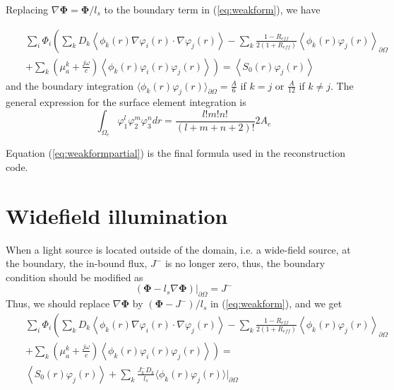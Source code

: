 \documentclass[12pt]{book}               %
\begin{document}
Replacing $\nabla{\boldsymbol\Phi}=\boldsymbol\Phi/l_s$ to the boundary term in (\ref{eq:weakform}), we
have

\begin{eqnarray}
\label{eq:weakformpartial}\nonumber&&\sum_{i}\Phi_i\left(\sum_{k}D_k\left\langle
\phi_k(r)\nabla\varphi_i(r)\cdot\nabla\varphi_j(r)\right\rangle -
\sum_{k}\frac{1-R_{eff}}{2(1+R_{eff})}\left\langle
\phi_k(r)\varphi_j(r)\right\rangle_{\partial\Omega}\right.
\\&&\left.+\sum_{k}\left(\mu_{a}^k+\frac{j\omega}{c}\right)\left\langle\phi_k(r)\varphi_i(r)\varphi_j(r)\right\rangle\right)=\left\langle
S_0(r)\varphi_j(r)\right\rangle
\end{eqnarray}
and the boundary integration $\langle\phi_k(r)\varphi_j(r)\rangle_{\partial\Omega}=\frac{A}{6}$ if $k=j$ 
or $\frac{A}{12}$ if $k\ne j$. The general expression for the surface element integration is
\begin{equation}
\int_{\Omega_e}\varphi_1^l\varphi_2^m\varphi_3^ndr=\frac{l!m!n!}{(l+m+n+2)!}2A_e
\end{equation}


Equation (\ref{eq:weakformpartial}) is the final formula used in
the reconstruction code.

\section{Widefield illumination}
When a light source is located outside of the domain, i.e. a wide-field source, at the boundary, the 
in-bound flux, $J^-$ is no longer zero, thus, the boundary condition should be modified as
\begin{equation}
\label{eq:widefieldsrc} \left(\boldsymbol\Phi-l_s\nabla{\boldsymbol\Phi}\right)|_{\partial\Omega}=J^-
\end{equation}
Thus, we should replace $\nabla{\boldsymbol\Phi}$ by $(\boldsymbol\Phi - J^-)/l_s$ in (\ref{eq:weakform}), and we get
\begin{eqnarray}\nonumber
\label{eq:weakformwidefield}\nonumber&&\sum_{i}\Phi_i\left(\sum_{k}D_k\left\langle
\phi_k(r)\nabla\varphi_i(r)\cdot\nabla\varphi_j(r)\right\rangle -
\sum_{k}\frac{1-R_{eff}}{2(1+R_{eff})}\left\langle
\phi_k(r)\varphi_j(r)\right\rangle_{\partial\Omega}\right.
\\&&\left.+\sum_{k}\left(\mu_{a}^k+\frac{j\omega}{c}\right)\left\langle\phi_k(r)\varphi_i(r)\varphi_j(r)\right\rangle\right)=\\\nonumber
&& \left\langle S_0(r)\varphi_j(r)\right\rangle + \sum_k\frac{J^-_kD_k}{l_s}\langle\phi_k(r)\varphi_j(r)\rangle|_{\partial\Omega}
\end{eqnarray}
\end{document}

